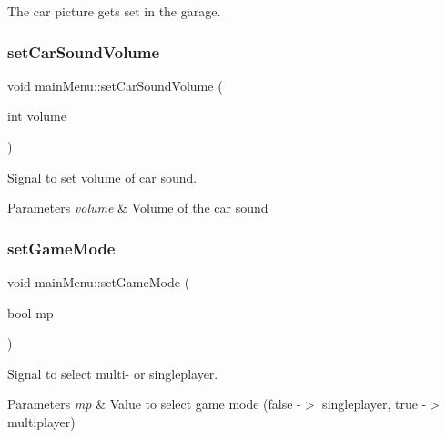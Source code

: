 The car picture gets set in the garage. 

\mbox{\label{classmain_menu_ac85de7f3210a2b60d19bd2100e13bd06}} 
\subsubsection{\texorpdfstring{setCarSoundVolume}{setCarSoundVolume}}
{\footnotesize\ttfamily void main\+Menu\+::set\+Car\+Sound\+Volume (\begin{DoxyParamCaption}\item[{int}]{volume }\end{DoxyParamCaption})\hspace{0.3cm}{\ttfamily [signal]}}



Signal to set volume of car sound. 


\begin{DoxyParams}{Parameters}
{\em volume} & Volume of the car sound \\
\hline
\end{DoxyParams}
\mbox{\label{classmain_menu_a0eb01011a1b95cacfb26975574993c65}} 
\subsubsection{\texorpdfstring{setGameMode}{setGameMode}}
{\footnotesize\ttfamily void main\+Menu\+::set\+Game\+Mode (\begin{DoxyParamCaption}\item[{bool}]{mp }\end{DoxyParamCaption})\hspace{0.3cm}{\ttfamily [signal]}}



Signal to select multi-\/ or singleplayer. 


\begin{DoxyParams}{Parameters}
{\em mp} & Value to select game mode (false -\/$>$ singleplayer, true -\/$>$ multiplayer) \\
\hline
\end{DoxyParams}
\mbox{\label{classmain_menu_adca150b2487152f0145a0c9afc255915}} 

